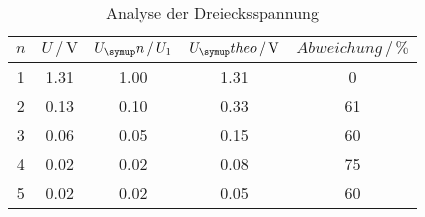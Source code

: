 \begin{table}
  \centering
  \begin{tabular}{c c c c c}
    \toprule
    $n$ & $U \,/\,\si{\volt}$ & $U_\su{n}\,/\,U_1$ & $U_\su{theo}\,/\,\si{\volt}$
    & $Abweichung\,/\, \%$ \\
    \midrule
    1   &   1.31   &  1.00  &   1.31  &   0 \\
    2   &   0.13   &  0.10  &   0.33  &   61 \\
    3   &   0.06   &  0.05  &   0.15  &   60 \\
    4   &   0.02   &  0.02  &   0.08  &   75 \\
    5   &   0.02   &  0.02  &   0.05  &   60 \\
    \bottomrule
  \end{tabular}
  \caption{Analyse der Dreiecksspannung}
  \label{tab:anadrei}
\end{table}
